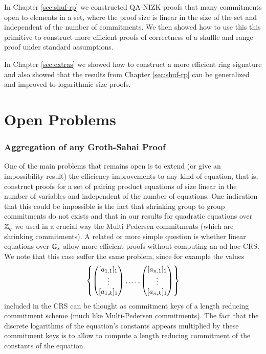 In Chapter \ref{sec:shuf-rp} we constructed QA-NIZK proofs that many commitments open to elements in a set, where the proof size is linear in the size of the set and independent of the number of commitments. We then showed how to use this this primitive to construct more efficient proofs of correctness of a shuffle and range proof under standard assumptions.

In Chapter \ref{sec:extras} we showed how to construct a more efficient ring signature and also showed that the results from Chapter \ref{sec:shuf-rp} can be generalized and improved to logarithmic size proofs.

\section{Open Problems}

\subsubsection{Aggregation of any Groth-Sahai Proof}
One of the main problems that remains open is to extend (or give an impossibility result) the efficiency improvements to any kind of equation, that is, construct proofs for a set of pairing product equations of size linear in the number of variables and independent of the number of equations. One indication that this could be impossible is the fact that shrinking group to group commitments do not exists \cite{EC:AbeHarOhk12} and that in our results for quadratic equations over $\mathbb{Z}_q$ we used in a crucial way the Multi-Pedersen commitments (which are shrinking commitments). A related or more simple question is whether linear equations over $\mathbb{G}_s$ allow more efficient proofs without computing an ad-hoc CRS. We note that this case suffer the same problem, since for example the values 
$$\left\{\left(\begin{matrix}{[a_{1,1}]_1}\\\vdots\\{[a_{1,k}]_1}\end{matrix}\right),\ldots,\left(\begin{matrix}{[a_{n,1}]_1}\\\vdots\\{[a_{n,k}]_1}\end{matrix}\right)\right\}$$
included in the CRS can be thought as commitment keys of a length reducing commitment scheme (much like Multi-Pedersen commitments). The fact that the discrete logarithms of the equation's constants appears multiplied by these commitment keys is to allow to compute a length reducing commitment of the constants of the equation.

